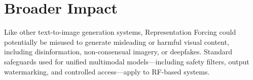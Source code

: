 \section{Broader Impact}

Like other text-to-image generation systems, Representation Forcing could potentially be misused to generate misleading or harmful visual content, including disinformation, non-consensual imagery, or deepfakes. Standard safeguards used for unified multimodal models---including safety filters, output watermarking, and controlled access---apply to RF-based systems.
